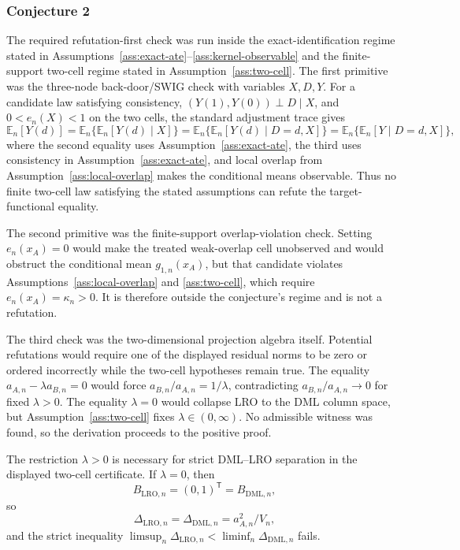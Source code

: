 \documentclass[11pt]{article}
\newcommand{\E}{\mathbb{E}}
\newcommand{\transpose}{\mathsf{T}}
\theoremstyle{definition}
\theoremstyle{plain}
\theoremstyle{remark}
\begin{document}
\subsubsection*{Conjecture 2}
The required refutation-first check was run inside the exact-identification regime stated in Assumptions~\ref{ass:exact-ate}--\ref{ass:kernel-observable} and the finite-support two-cell regime stated in Assumption~\ref{ass:two-cell}.  The first primitive was the three-node back-door/SWIG check with variables \(X,D,Y\).  For a candidate law satisfying consistency, \((Y(1),Y(0))\perp D\mid X\), and \(0<e_n(X)<1\) on the two cells, the standard adjustment trace gives
\[
  \E_n[Y(d)]
  =\E_n\{\E_n[Y(d)\mid X]\}
  =\E_n\{\E_n[Y(d)\mid D=d,X]\}
  =\E_n\{\E_n[Y\mid D=d,X]\},
\]
where the second equality uses Assumption~\ref{ass:exact-ate}, the third uses consistency in Assumption~\ref{ass:exact-ate}, and local overlap from Assumption~\ref{ass:local-overlap} makes the conditional means observable.  Thus no finite two-cell law satisfying the stated assumptions can refute the target-functional equality.

The second primitive was the finite-support overlap-violation check.  Setting \(e_n(x_A)=0\) would make the treated weak-overlap cell unobserved and would obstruct the conditional mean \(g_{1,n}(x_A)\), but that candidate violates Assumptions~\ref{ass:local-overlap} and \ref{ass:two-cell}, which require \(e_n(x_A)=\kappa_n>0\).  It is therefore outside the conjecture's regime and is not a refutation.

The third check was the two-dimensional projection algebra itself.  Potential refutations would require one of the displayed residual norms to be zero or ordered incorrectly while the two-cell hypotheses remain true.  The equality \(a_{A,n}-\lambda a_{B,n}=0\) would force \(a_{B,n}/a_{A,n}=1/\lambda\), contradicting \(a_{B,n}/a_{A,n}\to0\) for fixed \(\lambda>0\).  The equality \(\lambda=0\) would collapse LRO to the DML column space, but Assumption~\ref{ass:two-cell} fixes \(\lambda\in(0,\infty)\).  No admissible witness was found, so the derivation proceeds to the positive proof.

The restriction \(\lambda>0\) is necessary for strict DML--LRO separation in the displayed two-cell certificate.  If \(\lambda=0\), then
\[
  B_{\mathrm{LRO},n}=(0,1)^\transpose=B_{\mathrm{DML},n},
\]
so
\[
  \Delta_{\mathrm{LRO},n}=\Delta_{\mathrm{DML},n}=a_{A,n}^2/V_n,
\]
and the strict inequality \(\limsup_n\Delta_{\mathrm{LRO},n}<\liminf_n\Delta_{\mathrm{DML},n}\) fails.
\end{document}
